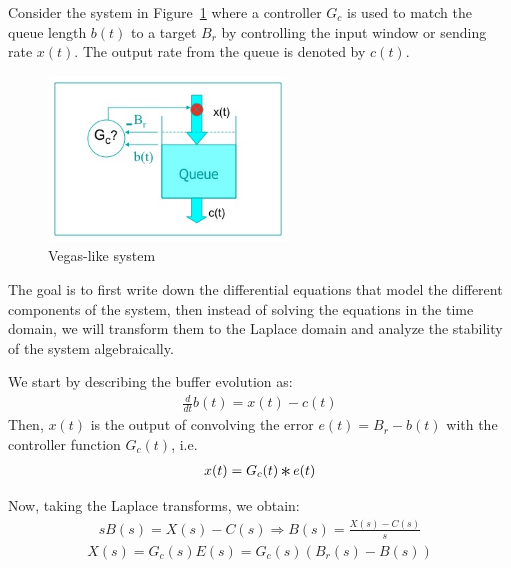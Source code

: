 \documentclass{article}
\newcommand{\Conv}{\mathop{\scalebox{1.5}{\raisebox{-0.2ex}{$\ast$}}}}%
\begin{document}
Consider the system in Figure~\ref{fig:vegas-control} where a controller $G_c$ is used to match
the queue length $b(t)$ to a target $B_r$ by controlling the input window or sending rate $x(t)$.
The output rate from the queue is denoted by $c(t)$.
\begin{figure}[htbp]
   \centering
   \includegraphics[width=2.5in]{figures/vegas-control.jpg} %
   \caption{Vegas-like system}
   \label{fig:vegas-control}
\end{figure}
The goal is to first write down the differential equations that model the different components of the system,
then instead of solving the equations in the time domain, we will transform them to the Laplace domain and
analyze the stability of the system algebraically.

We start by describing the buffer evolution as:
\begin{eqnarray*}
\frac{d}{dt} b(t) = x(t) - c(t)
\end{eqnarray*}
Then, $x(t)$ is the output of convolving the error $e(t) = B_r - b(t)$ with the controller function $G_c(t)$,
 i.e. 
\begin{eqnarray*}
x(t) = G_c(t) \Conv e(t)
\end{eqnarray*}

Now, taking the Laplace transforms, we obtain:
\begin{eqnarray*}
s B(s) = X(s) - C(s)  \Rightarrow  B(s) = \frac{X(s) - C(s)}{s}
\end{eqnarray*}
\begin{eqnarray*}
X(s) = G_c(s) E(s) = G_c(s) (B_r(s) - B(s))
\end{eqnarray*}
\end{document}
